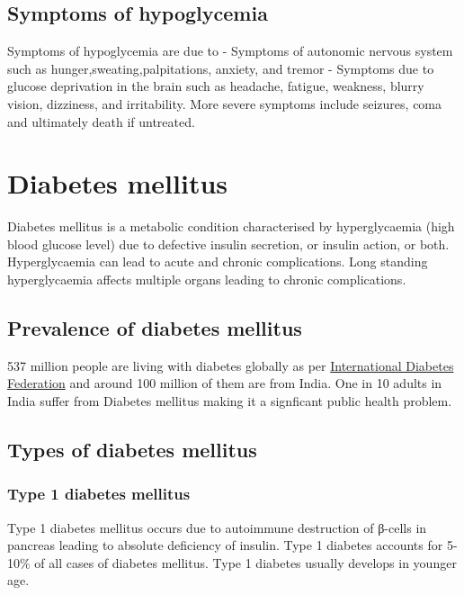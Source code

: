 \documentclass[
]{book}
\begin{document}
\section{Symptoms of hypoglycemia}\label{symptoms-of-hypoglycemia}

Symptoms of hypoglycemia are due to
- Symptoms of autonomic nervous system such as hunger,sweating,palpitations, anxiety, and tremor
- Symptoms due to glucose deprivation in the brain such as headache, fatigue, weakness, blurry vision, dizziness, and irritability. More severe symptoms include seizures, coma and ultimately death if untreated.

\chapter{Diabetes mellitus}\label{diabetes-mellitus}

Diabetes mellitus is a metabolic condition characterised by hyperglycaemia (high blood glucose level) due to defective insulin secretion, or insulin action, or both. Hyperglycaemia can lead to acute and chronic complications. Long standing hyperglycaemia affects multiple organs leading to chronic complications.

\section{Prevalence of diabetes mellitus}\label{prevalence-of-diabetes-mellitus}

537 million people are living with diabetes globally as per \hyperref[https:ux2fux2fdiabetesatlas.orgux2f]{International Diabetes Federation} and around 100 million of them are from India. One in 10 adults in India suffer from Diabetes mellitus making it a signficant public health problem.

\section{Types of diabetes mellitus}\label{types-of-diabetes-mellitus}

\subsection{Type 1 diabetes mellitus}\label{type-1-diabetes-mellitus}

Type 1 diabetes mellitus occurs due to autoimmune destruction of β-cells in pancreas leading to absolute deficiency of insulin. Type 1 diabetes accounts for 5-10\% of all cases of diabetes mellitus. Type 1 diabetes usually develops in younger age.
\end{document}
